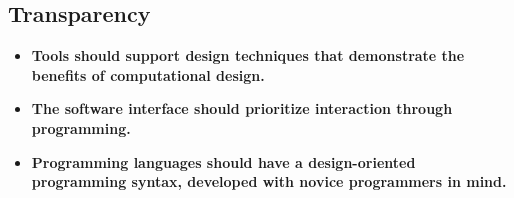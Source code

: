 \documentclass{sigchi}
\begin{document}
\subsection{Transparency}
\begin{itemize}
\item \textbf{Tools should support design techniques that demonstrate the benefits of computational design.} %
				
\item \textbf{The software interface should prioritize interaction through programming.} %

\item \textbf{Programming languages should have a design-oriented programming syntax, developed with novice programmers in mind.} %
\end{itemize}
\end{document}
